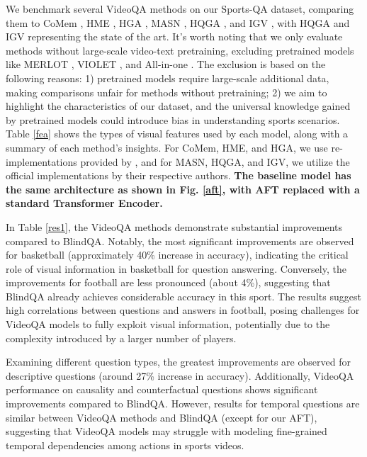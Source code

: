 We benchmark several VideoQA methods on our Sports-QA dataset, comparing them to CoMem \citep{gao2018motion}, HME \citep{fan2019heterogeneous}, HGA \citep{jiang2020reasoning}, MASN \citep{seo2021attend}, HQGA \citep{xiao2022video}, and IGV \citep{li2022invariant}, with HQGA \citep{xiao2022video} and IGV \citep{li2022invariant} representing the state of the art. It's worth noting that we only evaluate methods without large-scale video-text pretraining, excluding pretrained models like MERLOT \citep{zellers2021merlot}, VIOLET \citep{fu2021violet}, and All-in-one \citep{wang2022all}. The exclusion is based on the following reasons: 1) pretrained models require large-scale additional data, making comparisons unfair for methods without pretraining; 2) we aim to highlight the characteristics of our dataset, and the universal knowledge gained by pretrained models could introduce bias in understanding sports scenarios. Table \ref{fea} shows the types of visual features used by each model, along with a summary of each method's insights. For CoMem, HME, and HGA, we use re-implementations provided by \citep{xiao2021next}, and for MASN, HQGA, and IGV, we utilize the official implementations by their respective authors. \textbf{The baseline model has the same architecture as shown in Fig. \ref{aft}, with AFT replaced with a standard Transformer Encoder.}

In Table \ref{res1}, the VideoQA methods demonstrate substantial improvements compared to BlindQA. Notably, the most significant improvements are observed for basketball (approximately 40\% increase in accuracy), indicating the critical role of visual information in basketball for question answering. Conversely, the improvements for football are less pronounced (about 4\%), suggesting that BlindQA already achieves considerable accuracy in this sport. The results suggest high correlations between questions and answers in football, posing challenges for VideoQA models to fully exploit visual information, potentially due to the complexity introduced by a larger number of players.

Examining different question types, the greatest improvements are observed for descriptive questions (around 27\% increase in accuracy). Additionally, VideoQA performance on causality and counterfactual questions shows significant improvements compared to BlindQA. However, results for temporal questions are similar between VideoQA methods and BlindQA (except for our AFT), suggesting that VideoQA models may struggle with modeling fine-grained temporal dependencies among actions in sports videos.

